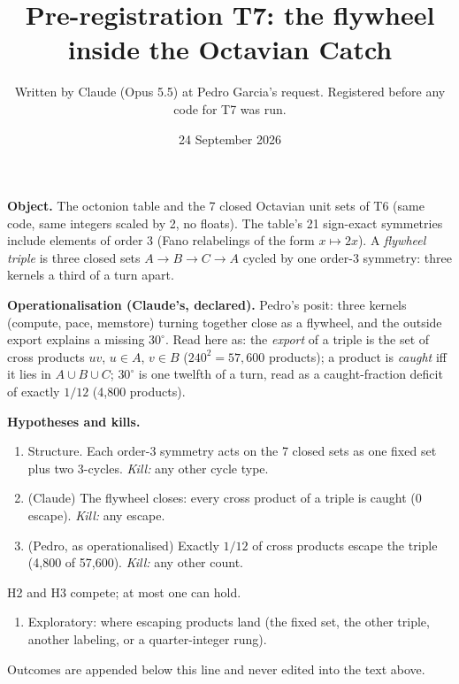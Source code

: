 \documentclass[11pt,a4paper]{article}
\title{Pre-registration T7: the flywheel inside the Octavian Catch}
\author{Written by Claude (Opus 5.5) at Pedro Garcia's request. Registered before any code for T7 was run.}
\date{24 September 2026}
\begin{document}
\maketitle
\textbf{Object.} The octonion table and the 7 closed Octavian unit sets of T6 (same code, same integers scaled by 2, no floats). The table's 21 sign-exact symmetries include elements of order 3 (Fano relabelings of the form $x\mapsto 2x$). A \emph{flywheel triple} is three closed sets $A\to B\to C\to A$ cycled by one order-3 symmetry: three kernels a third of a turn apart.

\textbf{Operationalisation (Claude's, declared).} Pedro's posit: three kernels (compute, pace, memstore) turning together close as a flywheel, and the outside export explains a missing $30^\circ$. Read here as: the \emph{export} of a triple is the set of cross products $uv$, $u\in A$, $v\in B$ ($240^2=57{,}600$ products); a product is \emph{caught} iff it lies in $A\cup B\cup C$; $30^\circ$ is one twelfth of a turn, read as a caught-fraction deficit of exactly $1/12$ (4,800 products).

\textbf{Hypotheses and kills.}
\begin{enumerate}
\item[H1] Structure. Each order-3 symmetry acts on the 7 closed sets as one fixed set plus two 3-cycles. \emph{Kill:} any other cycle type.
\item[H2] (Claude) The flywheel closes: every cross product of a triple is caught (0 escape). \emph{Kill:} any escape.
\item[H3] (Pedro, as operationalised) Exactly $1/12$ of cross products escape the triple (4,800 of 57,600). \emph{Kill:} any other count.
\end{enumerate}
H2 and H3 compete; at most one can hold.
\begin{enumerate}\item[E1] Exploratory: where escaping products land (the fixed set, the other triple, another labeling, or a quarter-integer rung).

\end{enumerate}
Outcomes are appended below this line and never edited into the text above.
\end{document}
